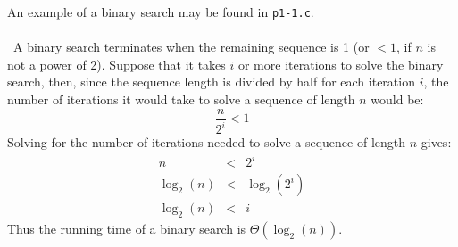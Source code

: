 An example of a binary search may be found in \texttt{p1-1.c}.
\\ \\
\noindent~A binary search terminates when the remaining sequence is 1 (or $< 1$, if $n$ is not a power of 2). Suppose that it takes $i$ or more iterations to solve the binary search, then, since the sequence length is divided by half for each iteration $i$, the number of iterations it would take to solve a sequence of length $n$ would be:
\begin{equation*}
	\frac{n}{2^i} < 1
\end{equation*}
Solving for the number of iterations needed to solve a sequence of length $n$ gives:
\begin{eqnarray*}
	n & < & 2^i \\
	\log_2(n) & < & \log_2(2^i) \\
	\log_2(n) & < & i
\end{eqnarray*}
Thus the running time of a binary search is $\Theta(\log_2(n))$.
